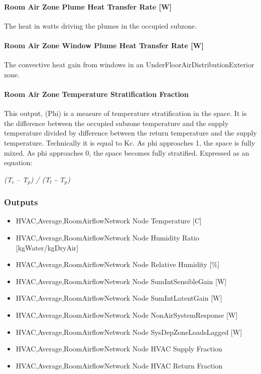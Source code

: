 \paragraph{Room Air Zone Plume Heat Transfer Rate {[}W{]}}\label{room-air-zone-plume-heat-transfer-rate-w}

The heat in watts driving the plumes in the occupied subzone.

\paragraph{Room Air Zone Window Plume Heat Transfer Rate {[}W{]}}\label{room-air-zone-window-plume-heat-transfer-rate-w}

The convective heat gain from windows in an UnderFloorAirDistributionExterior zone.

\paragraph{\texorpdfstring{Room Air Zone Temperature Stratification Fraction \protect\hyperlink{section-1}{}}{Room Air Zone Temperature Stratification Fraction }}\label{room-air-zone-temperature-stratification-fraction}

This output, (Phi) is a measure of temperature stratification in the space. It is the difference between the occupied subzone temperature and the supply temperature divided by difference between the return temperature and the supply temperature. Technically it is equal to Kc. As phi approaches 1, the space is fully mixed. As phi approaches 0, the space becomes fully stratified. Expressed as an equation:

\emph{(T\(_{c}\)} -- \emph{T\(_{p}\)) / (T\(_{t}\)} \emph{- T\(_{p}\))}

\subsubsection{Outputs}\label{outputs-7-009}

\begin{itemize}
\item
  HVAC,Average,RoomAirflowNetwork Node Temperature {[}C{]}
\item
  HVAC,Average,RoomAirflowNetwork Node Humidity Ratio {[}kgWater/kgDryAir{]}
\item
  HVAC,Average,RoomAirflowNetwork Node Relative Humidity {[}\%{]}
\item
  HVAC,Average,RoomAirflowNetwork Node SumIntSensibleGain {[}W{]}
\item
  HVAC,Average,RoomAirflowNetwork Node SumIntLatentGain {[}W{]}
\item
  HVAC,Average,RoomAirflowNetwork Node NonAirSystemResponse {[}W{]}
\item
  HVAC,Average,RoomAirflowNetwork Node SysDepZoneLoadsLagged {[}W{]}
\item
  HVAC,Average,RoomAirflowNetwork Node HVAC Supply Fraction \protect\hyperlink{section-1}{}
\item
  HVAC,Average,RoomAirflowNetwork Node HVAC Return Fraction \protect\hyperlink{section-1}{}
\end{itemize}

